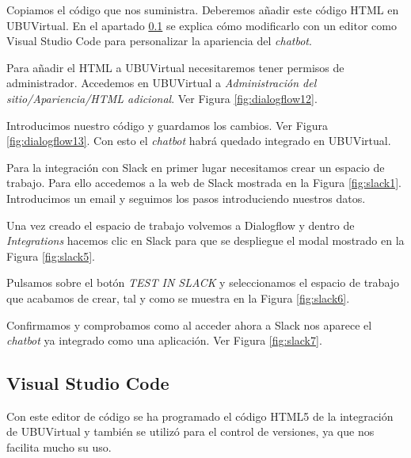 Copiamos el código que nos suministra. Deberemos añadir este código HTML en UBUVirtual. En el apartado \ref{personalizacionHTML} se explica cómo modificarlo con un editor como Visual Studio Code para personalizar la apariencia del \textit{chatbot}.

Para añadir el HTML a UBUVirtual necesitaremos tener permisos de administrador. Accedemos en UBUVirtual a \textit{Administración del sitio/Apariencia/HTML adicional}. Ver Figura \ref{fig:dialogflow12}.


Introducimos nuestro código y guardamos los cambios. Ver Figura \ref{fig:dialogflow13}. Con esto el \textit{chatbot} habrá quedado integrado en UBUVirtual.


Para la integración con Slack en primer lugar necesitamos crear un espacio de trabajo. Para ello accedemos a la web de Slack \cite{urlSlack} mostrada en la Figura \ref{fig:slack1}. Introducimos un email y seguimos los pasos introduciendo nuestros datos.


Una vez creado el espacio de trabajo volvemos a Dialogflow y dentro de \textit{Integrations} hacemos clic en Slack para que se despliegue el modal mostrado en la Figura \ref{fig:slack5}.


Pulsamos sobre el botón \textit{TEST IN SLACK} y seleccionamos el espacio de trabajo que acabamos de crear, tal y como se muestra en la Figura \ref{fig:slack6}.


Confirmamos y comprobamos como al acceder ahora a Slack nos aparece el \textit{chatbot} ya integrado como una aplicación. Ver Figura \ref{fig:slack7}.



\subsection{Visual Studio Code} \label{personalizacionHTML}

Con este editor de código se ha programado el código HTML5 de la integración de UBUVirtual y también se utilizó para el control de versiones, ya que nos facilita mucho su uso.

